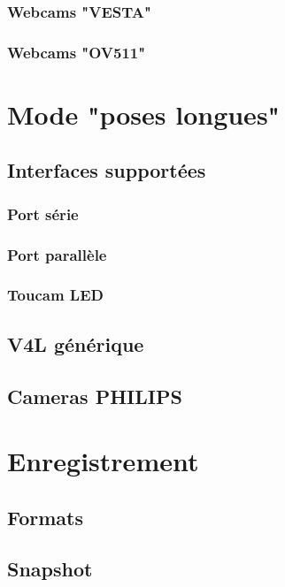 \documentclass[11pt,a4paper]{book}
\begin{document}
\subsection{Webcams "VESTA"}

\subsection{Webcams "OV511"}

\chapter{Mode "poses longues"}

\section{Interfaces support\'ees}

\subsection{Port s\'erie}

\subsection{Port parall\`ele}

\subsection{Toucam LED}

\section{V4L g\'en\'erique}

\section{Cameras PHILIPS}

\chapter{Enregistrement}

\section{Formats}

\section{Snapshot}
\end{document}
